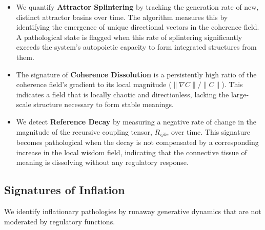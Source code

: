 \begin{itemize}

    \item We quantify \textbf{Attractor Splintering} by tracking the generation rate of new, distinct attractor basins over time. The algorithm measures this by identifying the emergence of unique directional vectors in the coherence field. A pathological state is flagged when this rate of splintering significantly exceeds the system's autopoietic capacity to form integrated structures from them.

    \item The signature of \textbf{Coherence Dissolution} is a persistently high ratio of the coherence field's gradient to its local magnitude (\(\|\nabla C\| / \|C\|\)). This indicates a field that is locally chaotic and directionless, lacking the large-scale structure necessary to form stable meanings.

    \item We detect \textbf{Reference Decay} by measuring a negative rate of change in the magnitude of the recursive coupling tensor, \(R_{ijk}\), over time. This signature becomes pathological when the decay is not compensated by a corresponding increase in the local wisdom field, indicating that the connective tissue of meaning is dissolving without any regulatory response.

\end{itemize}


\subsection{Signatures of Inflation}
\label{16.2.3:signatures_of_inflation}

We identify inflationary pathologies by runaway generative dynamics that are not moderated by regulatory functions.

